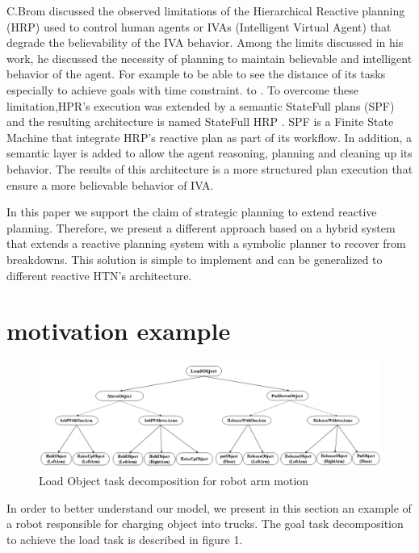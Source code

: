 \documentclass[conference]{IEEEtran}
\begin{document}
		C.Brom \cite{brom2005hierarchical} discussed the observed limitations of the  Hierarchical Reactive planning (HRP) used to control human agents or IVAs (Intelligent Virtual Agent) that degrade the believability of the IVA behavior. Among the limits discussed in his work, he discussed the necessity of planning to maintain believable and intelligent behavior of the agent. For example to be able to see the distance of its tasks especially to achieve goals with time constraint. to . To overcome these limitation,HPR's execution was extended by a semantic StateFull plans (SPF) and the resulting architecture is named StateFull HRP \cite{plchtowards}.  SPF is a Finite State Machine that integrate HRP's reactive plan as part of its workflow. In addition, a semantic layer is added to allow the agent reasoning, planning and cleaning up its behavior. The results of this architecture is a more structured plan execution that ensure a more believable behavior of IVA.   
		 \par In this paper we support the claim of strategic planning to extend reactive planning. Therefore, we present a different approach based on a hybrid system that extends a reactive planning system with a symbolic planner to recover from breakdowns. This solution is simple to implement and can be generalized to different reactive HTN's architecture. 
	\section{motivation example}
	\label{sec:example}
		\begin{figure}[t]
		 		\label{fig:ex}
		 		\includegraphics[width=\textwidth]{Figures/example1}
		 		\caption{Load Object task decomposition for robot arm motion}
		 	\end{figure}
	
	\par In order to better understand our model, we present in this section an example of 	a robot responsible for charging object into trucks. The  goal task decomposition to achieve the load task is described in figure 1.
	 
\end{document}
